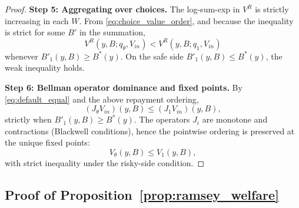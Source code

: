 \documentclass[12pt]{article}
\theoremstyle{plain}
\begin{document}
\begin{proof}
	\medskip
	\textbf{Step 5: Aggregating over choices.}
	The log-sum-exp in $V^R$ is strictly increasing in each $W$.
	From \eqref{eq:choice_value_order}, and because the inequality is strict for some $B'$ in the summation,
	\[
		V^R(y,B;q_\theta,V_{in}) < V^R(y,B;q_1,V_{in})
	\]
	whenever $B'_1(y,B)\ge B^*(y)$. On the safe side $B'_1(y,B)\le B^*(y)$, the
	weak inequality holds.

	\medskip
	\textbf{Step 6: Bellman operator dominance and fixed points.}
	By \eqref{eq:default_equal} and the above repayment ordering,
	\[
		(J_\theta V_{in})(y,B) \le (J_1V_{in})(y,B),
	\]
	strictly when $B'_1(y,B)\ge B^*(y)$. The operators $J_i$ are monotone and
	contractions (Blackwell conditions), hence the pointwise ordering is preserved
	at the unique fixed points:
	\[
		V_\theta(y,B) \le V_1(y,B),
	\]
	with strict inequality under the risky-side condition.

\end{proof}

\subsection{Proof of Proposition~\ref{prop:ramsey_welfare}}\label{app:proof_ramsey}
\end{document}
